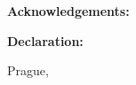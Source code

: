 {  %
  \thispagestyle{plain}
  \noindent
  \begin{minipage}[t]{\textwidth}\vspace{0pt}%
    \doccol \Large \textbf{Acknowledgements:}
  \end{minipage} \par
  \vspace{0.5cm}
  \noindent
  \begin{minipage}[t]{\textwidth}\vspace{0pt}%
    \@Acknowledgment
  \end{minipage} \par
  \vfill
  \noindent
  \begin{minipage}[t]{\textwidth}\vspace{0pt}%
    \doccol \Large \textbf{Declaration:}
  \end{minipage} \par
  \vspace{0.5cm}
  \noindent
  \begin{minipage}[t]{\textwidth}\vspace{0pt}%
    \@Declaration
  \end{minipage} \par
  \vspace{1.5cm}
  \noindent
  \begin{minipage}[t]{0.7\textwidth}\vspace{0pt}%
    Prague, \@date
  \end{minipage}
  \begin{minipage}[t]{0.3\textwidth}\vspace{0pt}%
    \centering ~ \par \textbf{\dotfill} \par \@Author
  \end{minipage}
  \clearpage

  \thispagestyle{plain}
}
